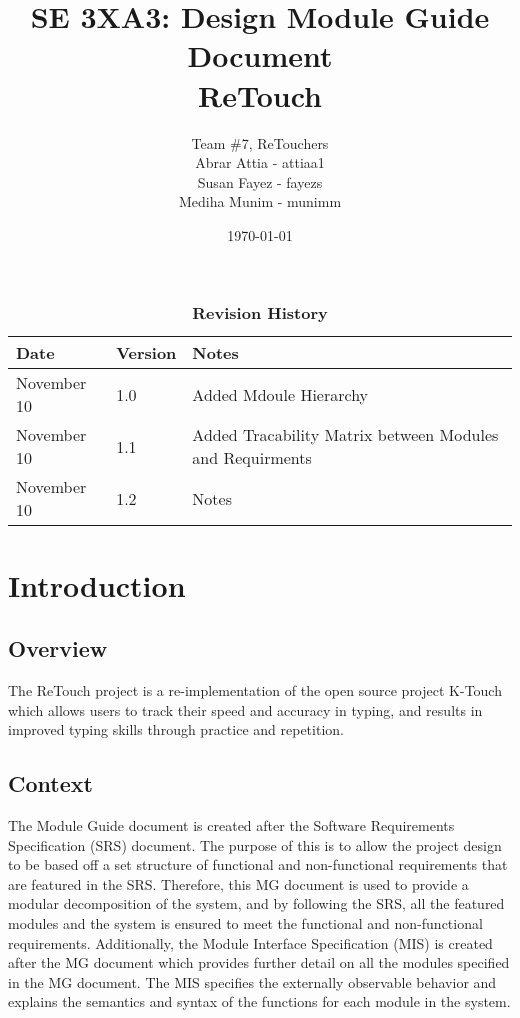 \documentclass[12pt, titlepage]{article}
\title{SE 3XA3: Design Module Guide Document\\ReTouch}
\author{Team \#7, ReTouchers
		\\ Abrar Attia - attiaa1
		\\ Susan Fayez - fayezs
		\\ Mediha Munim - munimm
}
\date{\today}
\begin{document}
\maketitle

\tableofcontents
\listoftables
\listoffigures

\begin{table}[!bp]
\caption{\bf Revision History}
\begin{tabularx}{\textwidth}{p{3cm}p{2cm}X}
\toprule {\bf Date} & {\bf Version} & {\bf Notes}\\
\midrule
November 10 & 1.0 & Added Mdoule Hierarchy\\
November 10 & 1.1 & Added Tracability Matrix between Modules and Requirments\\
November 10 & 1.2 & Notes\\
\bottomrule
\end{tabularx}
\end{table}

\newpage
\clearpage


\section{Introduction}

\subsection{Overview}
The ReTouch project is a re-implementation of the open source project K-Touch which allows users to track their speed and accuracy in typing, and results in improved typing skills through practice and repetition.

\subsection{Context}
The Module Guide document is created after the Software Requirements Specification (SRS) document. The purpose of this is to allow the project design to be based off a set structure of functional and non-functional requirements that are featured in the SRS. Therefore, this MG document is used to provide a modular decomposition of the system, and by following the SRS, all the featured modules and the system is ensured to meet the functional and non-functional requirements. Additionally, the Module Interface Specification (MIS) is created after the MG document which provides further detail on all the modules specified in the MG document. The MIS specifies the externally observable behavior and explains the semantics and syntax of the functions for each module in the system.
\end{document}

